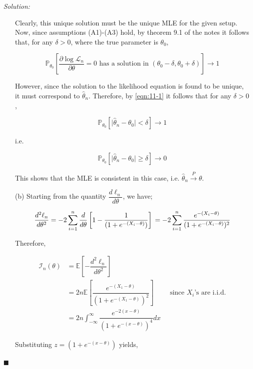 \documentclass[12pt]{article}
\newcommand{\E}{\mathbb{E}}
\newcommand{\prob}{\mathbb{P}}
\theoremstyle{definition}
\newenvironment{answer}{\textit{Solution: }\quad }{ \hfill $\blacksquare$}
\numberwithin{equation}{section}
\begin{document}
\begin{answer}
\begin{enumerate}
        Clearly, this unique solution must be the unique MLE for the given setup. Now, since assumptions (A1)-(A3) hold, by theorem 9.1 of the notes it follows that, for any $\delta > 0$, where the true parameter is $\theta_0$,

        \begin{equation}
            \prob_{\theta_0} \left[ \dfrac{\partial\log \mathcal{L}_n}{\partial \theta} = 0 \text{ has a solution in } (\theta_0 - \delta, \theta_0 + \delta) \right] \rightarrow 1
            \label{eqn:11-1}  
        \end{equation}

        However, since the solution to the likelihood equation is found to be unique, it must correspond to $\widehat{\theta}_n$. Therefore, by \cref{eqn:11-1} it follows that for any $\delta > 0$,

        $$
        \prob_{\theta_0} \left[ \vert \widehat{\theta}_n - \theta_0 \vert < \delta \right] \rightarrow 1
        $$

        i.e.

        $$
        \prob_{\theta_0} \left[ \vert \widehat{\theta}_n - \theta_0 \vert \geq \delta \right] \rightarrow 0
        $$

        This shows that the MLE is consistent in this case, i.e. $\widehat{\theta}_n \xrightarrow{P} \theta$.

        \item[(b)] Starting from the quantity $\dfrac{d \ell_n}{d \theta}$, we have;
        
        $$
        \dfrac{d^2 \ell_n}{d \theta^2} 
        = -2 \sum_{i=1}^{n} \dfrac{d}{d\theta} \left[1 - \dfrac{1}{(1 + e^{-(X_i - \theta)})} \right]\\
        = -2 \sum_{i=1}^{n} \dfrac{e^{-(X_i - \theta)}}{(1 + e^{-(X_i - \theta)})^2}
        $$

        Therefore,

        \begin{align*}
            \mathcal{I}_n(\theta)
            & = \E\left[ -\dfrac{d^2 \ell_n}{d \theta^2} \right]\\
            & = 2n \E\left[ \dfrac{e^{-(X_1 - \theta)}}{(1 + e^{-(X_1 - \theta)})^2} \right] \qquad \text{ since } X_i\text{'s are i.i.d.}\\
            & = 2n \int_{-\infty}^{\infty} \dfrac{e^{-2(x-\theta)}}{(1 + e^{-(x - \theta)})^4} dx
        \end{align*}

        Substituting $z = (1 + e^{-(x-\theta)})$ yields,


\end{enumerate}
\end{answer}
\end{document}
